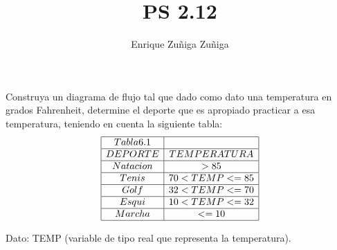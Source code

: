 \documentclass[11pt]{amsart}
\title{PS 2.12}
\author{Enrique Zuñiga Zuñiga}
\begin{document}
\maketitle
\noindent Construya un diagrama de flujo tal que dado como dato una temperatura en grados Fahrenheit, determine el deporte que es apropiado practicar a esa temperatura, teniendo en cuenta la siguiente tabla:\newline
$$
\begin{array}{|c|c|}
\hline
Tabla 6.1 &\\
\hline
DEPORTE & TEMPERATURA\\
\hline
Natacion & > 85\\
\hline
Tenis &70 < TEMP <= 85\\
\hline
Golf &32 < TEMP <= 70\\
\hline
Esqui &10 < TEMP <= 32\\
\hline
Marcha &<= 10\\
\hline
\end{array}
$$\newline

\noindent Dato: TEMP (variable de tipo real que representa la temperatura).\newline
\end{document}
